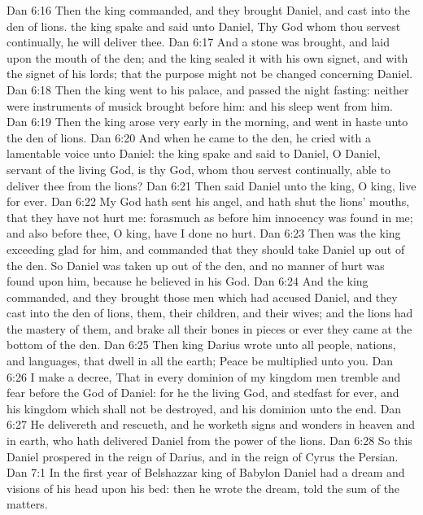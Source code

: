 \vs Dan 6:16 Then the king commanded, and they brought Daniel, and cast  into the den of lions.  the king spake and said unto Daniel, Thy God whom thou servest continually, he will deliver thee.
\vs Dan 6:17 And a stone was brought, and laid upon the mouth of the den; and the king sealed it with his own signet, and with the signet of his lords; that the purpose might not be changed concerning Daniel.
\vs Dan 6:18 Then the king went to his palace, and passed the night fasting: neither were instruments of musick brought before him: and his sleep went from him.
\vs Dan 6:19 Then the king arose very early in the morning, and went in haste unto the den of lions.
\vs Dan 6:20 And when he came to the den, he cried with a lamentable voice unto Daniel:  the king spake and said to Daniel, O Daniel, servant of the living God, is thy God, whom thou servest continually, able to deliver thee from the lions?
\vs Dan 6:21 Then said Daniel unto the king, O king, live for ever.
\vs Dan 6:22 My God hath sent his angel, and hath shut the lions' mouths, that they have not hurt me: forasmuch as before him innocency was found in me; and also before thee, O king, have I done no hurt.
\vs Dan 6:23 Then was the king exceeding glad for him, and commanded that they should take Daniel up out of the den. So Daniel was taken up out of the den, and no manner of hurt was found upon him, because he believed in his God.
\vs Dan 6:24 And the king commanded, and they brought those men which had accused Daniel, and they cast  into the den of lions, them, their children, and their wives; and the lions had the mastery of them, and brake all their bones in pieces or ever they came at the bottom of the den.
\vs Dan 6:25 Then king Darius wrote unto all people, nations, and languages, that dwell in all the earth; Peace be multiplied unto you.
\vs Dan 6:26 I make a decree, That in every dominion of my kingdom men tremble and fear before the God of Daniel: for he  the living God, and stedfast for ever, and his kingdom  which shall not be destroyed, and his dominion  unto the end.
\vs Dan 6:27 He delivereth and rescueth, and he worketh signs and wonders in heaven and in earth, who hath delivered Daniel from the power of the lions.
\vs Dan 6:28 So this Daniel prospered in the reign of Darius, and in the reign of Cyrus the Persian.
\vs Dan 7:1 In the first year of Belshazzar king of Babylon Daniel had a dream and visions of his head upon his bed: then he wrote the dream,  told the sum of the matters.
